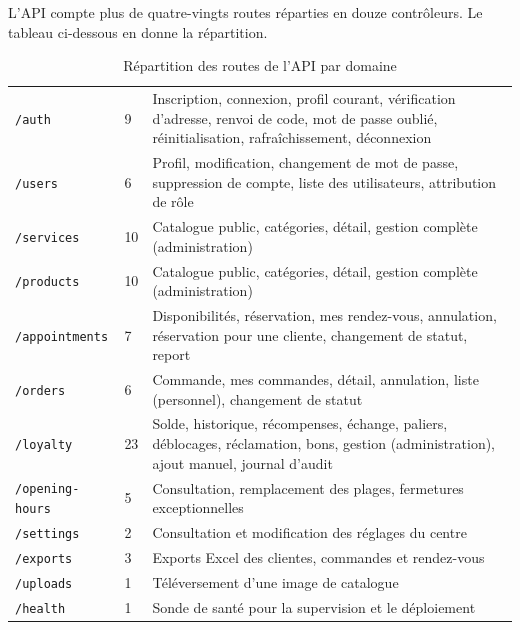 L'API compte plus de quatre-vingts routes réparties en douze contrôleurs. Le
tableau ci-dessous en donne la répartition.

\begin{table}[H]
\centering
\caption{Répartition des routes de l'API par domaine}
\label{tab:routes-api}
\begin{tabularx}{\textwidth}{L{3.1cm} C{1.7cm} X}
\toprule
{} &  &  \\
\midrule
\texttt{/auth} & 9 &
Inscription, connexion, profil courant, vérification d'adresse, renvoi de code,
mot de passe oublié, réinitialisation, rafraîchissement, déconnexion \\

\texttt{/users} & 6 &
Profil, modification, changement de mot de passe, suppression de compte, liste
des utilisateurs, attribution de rôle \\

\texttt{/services} & 10 &
Catalogue public, catégories, détail, gestion complète (administration) \\

\texttt{/products} & 10 &
Catalogue public, catégories, détail, gestion complète (administration) \\

\texttt{/appointments} & 7 &
Disponibilités, réservation, mes rendez-vous, annulation, réservation pour une
cliente, changement de statut, report \\

\texttt{/orders} & 6 &
Commande, mes commandes, détail, annulation, liste (personnel), changement de
statut \\

\texttt{/loyalty} & 23 &
Solde, historique, récompenses, échange, paliers, déblocages, réclamation,
bons, gestion (administration), ajout manuel, journal d'audit \\

\texttt{/opening-\allowbreak hours} & 5 &
Consultation, remplacement des plages, fermetures exceptionnelles \\

\texttt{/settings} & 2 & Consultation et modification des réglages du centre \\
\texttt{/exports} & 3 & Exports Excel des clientes, commandes et rendez-vous \\
\texttt{/uploads} & 1 & Téléversement d'une image de catalogue \\
\texttt{/health} & 1 & Sonde de santé pour la supervision et le déploiement \\
\bottomrule
\end{tabularx}
\end{table}


